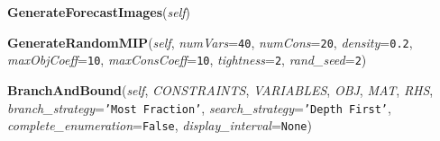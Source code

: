     \label{coinor:grumpy:BB:BBTree:GenerateForecastImages}

    \vspace{0.5ex}

\hspace{.8\funcindent}\begin{boxedminipage}{\funcwidth}

    \raggedright \textbf{GenerateForecastImages}(\textit{self})

\setlength{\parskip}{2ex}
\setlength{\parskip}{1ex}
    \end{boxedminipage}

    \label{coinor:grumpy:BB:BBTree:GenerateRandomMIP}

    \vspace{0.5ex}

\hspace{.8\funcindent}\begin{boxedminipage}{\funcwidth}

    \raggedright \textbf{GenerateRandomMIP}(\textit{self}, \textit{numVars}={\tt 40}, \textit{numCons}={\tt 20}, \textit{density}={\tt 0.2}, \textit{maxObjCoeff}={\tt 10}, \textit{maxConsCoeff}={\tt 10}, \textit{tightness}={\tt 2}, \textit{rand\_seed}={\tt 2})

\setlength{\parskip}{2ex}
\setlength{\parskip}{1ex}
    \end{boxedminipage}

    \label{coinor:grumpy:BB:BBTree:BranchAndBound}

    \vspace{0.5ex}

\hspace{.8\funcindent}\begin{boxedminipage}{\funcwidth}

    \raggedright \textbf{BranchAndBound}(\textit{self}, \textit{CONSTRAINTS}, \textit{VARIABLES}, \textit{OBJ}, \textit{MAT}, \textit{RHS}, \textit{branch\_strategy}={\tt \texttt{'}\texttt{Most Fraction}\texttt{'}}, \textit{search\_strategy}={\tt \texttt{'}\texttt{Depth First}\texttt{'}}, \textit{complete\_enumeration}={\tt False}, \textit{display\_interval}={\tt None})

\setlength{\parskip}{2ex}
\setlength{\parskip}{1ex}
    \end{boxedminipage}


